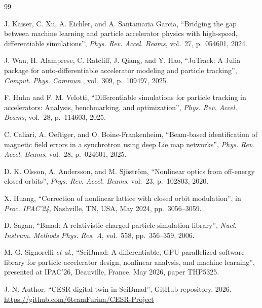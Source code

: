 \documentclass[letterpaper]{jacow}
\begin{document}
\begin{thebibliography}{99}

    J. Kaiser, C. Xu, A. Eichler, and A. Santamaria Garcia,
    ``Bridging the gap between machine learning and particle accelerator
    physics with high-speed, differentiable simulations'',
    \textit{Phys. Rev. Accel. Beams}, vol.~27, p.~054601, 2024.

    J. Wan, H. Alamprese, C. Ratcliff, J. Qiang, and Y. Hao,
    ``JuTrack: A Julia package for auto-differentiable accelerator modeling
    and particle tracking'', \textit{Comput. Phys. Commun.}, vol.~309,
    p.~109497, 2025. 

    F. Huhn and F. M. Velotti, ``Differentiable simulations for particle
    tracking in accelerators: Analysis, benchmarking, and optimization'',
    \textit{Phys. Rev. Accel. Beams}, vol.~28, p.~114603, 2025.

    C. Caliari, A. Oeftiger, and O. Boine-Frankenheim,
    ``Beam-based identification of magnetic field errors in a synchrotron
    using deep Lie map networks'', \textit{Phys. Rev. Accel. Beams}, vol.~28,
    p.~024601, 2025. 

    D. K. Olsson, A. Andersson, and M. Sj\"ostr\"om,
    ``Nonlinear optics from off-energy closed orbits'',
    \textit{Phys. Rev. Accel. Beams}, vol.~23, p.~102803, 2020.

    X. Huang, ``Correction of nonlinear lattice with closed orbit
    modulation'', in \textit{Proc. IPAC'24}, Nashville, TN, USA, May 2024,
    pp.~3056--3059. 

    D. Sagan, ``Bmad: A relativistic charged particle simulation library'',
    \textit{Nucl. Instrum. Methods Phys. Res. A}, vol.~558, pp.~356--359,
    2006. 

    M. G. Signorelli \textit{et al.}, ``SciBmad: A differentiable,
    GPU-parallelized software library for particle accelerator design,
    nonlinear analysis, and machine learning'', presented at IPAC'26,
    Deauville, France, May 2026, paper THP5325.

    J. N. Author, ``CESR digital twin in SciBmad'', GitHub repository, 2026.
    \url{https://github.com/6teamFurina/CESR-Project}


\end{thebibliography}
\end{document}
